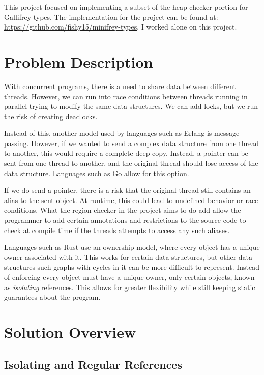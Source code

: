 \documentclass{article}
\begin{document}
  This project focused on implementing a subset of the heap checker portion for Gallifrey types.
  The implementation for the project can be found at:
    \url{https://github.com/fishy15/minifrey-types}.
  I worked alone on this project.

  \section{Problem Description}

  With concurrent programs,
    there is a need to share data between different threads.
  However,
    we can run into race conditions between threads running in parallel
    trying to modify the same data structures.
  We can add locks,
    but we run the risk of creating deadlocks.

  Instead of this,
    another model used by languages such as Erlang is message passing.
  However,
    if we wanted to send a complex data structure from one thread to another,
    this would require a complete deep copy.
  Instead,
    a pointer can be sent from one thread to another,
    and the original thread should lose access of the data structure.
  Languages such as Go allow for this option.

  If we do send a pointer,
    there is a risk that the original thread still contains an alias to the sent object.
  At runtime,
    this could lead to undefined behavior or race conditions.
  What the region checker in the project aims to do add allow the programmer
    to add certain annotations and restrictions
    to the source code
    to check at compile time if the threads attempts to access any such aliases.

  Languages such as Rust use an ownership model,
    where every object has a unique owner associated with it.
  This works for certain data structures,
    but other data structures such graphs with cycles in it
    can be more difficult to represent.
  Instead of enforcing every object must have a unique owner,
    only certain objects,
    known as \textit{isolating} references.
  This allows for greater flexibility
    while still keeping static guarantees about the program.

  \section{Solution Overview}

  \subsection{Isolating and Regular References}
\end{document}
